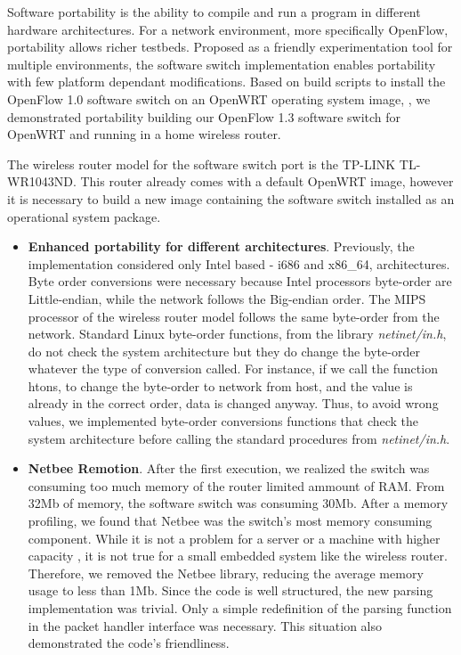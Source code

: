 Software portability is the ability to compile and run a program in different hardware architectures. For a network environment, more specifically OpenFlow, portability allows richer testbeds. Proposed as a friendly experimentation tool for multiple environments, the software switch implementation enables portability with few platform dependant modifications. Based on build scripts to install the OpenFlow 1.0 software switch on an OpenWRT \cite{OpenWrt} operating system image, \cite{yiakoumis2011}, we demonstrated portability building our OpenFlow 1.3 software switch for OpenWRT and running in a home wireless router.

The wireless router model for the software switch port is the TP-LINK TL-WR1043ND. This router already comes with a default OpenWRT image, however it is necessary to build a new image containing the software switch installed as an operational system package. 

\begin{itemize}
\item \textbf{Enhanced portability for different architectures}. Previously, the implementation considered only Intel based - i686 and x86_64, architectures. Byte order conversions were necessary because Intel processors byte-order are Little-endian, while the network follows the Big-endian order.  The MIPS processor of the wireless router model follows the same byte-order from the network. Standard Linux byte-order functions, from the library \textit{netinet/in.h}, do not check the system architecture but they do change the byte-order whatever the type of conversion called. For instance, if we call the function htons, to change the byte-order to network from host, and the value is already in the correct order, data is changed anyway. Thus, to avoid wrong values, we implemented byte-order conversions functions that check the system architecture before calling the standard procedures from \textit{netinet/in.h}.
\item \textbf{Netbee Remotion}. After the first execution, we realized the switch was consuming too much memory of the router limited ammount of RAM. From 32Mb of memory, the software switch was consuming 30Mb. After a memory profiling, we found that Netbee was the switch's most memory consuming component. While it is not a problem for a server or a machine with higher capacity , it is not true for a small embedded system like the wireless router. Therefore, we removed the Netbee library, reducing the average memory usage to less than 1Mb. Since the code is well structured, the new parsing implementation was trivial. Only a simple redefinition of the parsing function in the packet handler interface was necessary. This situation also demonstrated the code's friendliness. 

\end{itemize}


